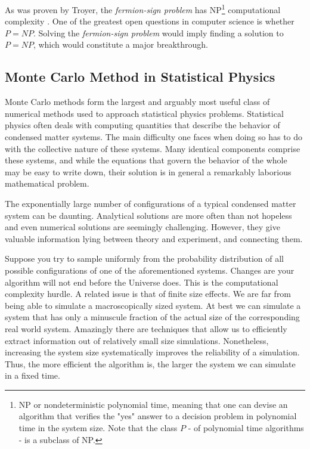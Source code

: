 As was proven by Troyer, the \emph{fermion-sign problem} has NP\footnote{NP or nondeterministic polynomial time, meaning that one can devise an algorithm that verifies the "yes" answer to a decision problem in polynomial time in the system size.
Note that the class $P$ - of polynomial time algorithms - is a subclass of NP.} computational complexity \cite{troyer_computational_2005}.
One of the greatest open questions in computer science is whether $P = NP$.
Solving the \emph{fermion-sign problem} would imply finding a solution to $P = NP$, which would constitute a major breakthrough.

\subsection{Monte Carlo Method in Statistical Physics}

Monte Carlo methods form the largest and arguably most useful class of numerical methods used to approach statistical physics problems.
Statistical physics often deals with computing quantities that describe the behavior of condensed matter systems.
The main difficulty one faces when doing so has to do with the collective nature of these systems.
Many identical components comprise these systems, and while the equations that govern the behavior of the whole may be easy to write down, their solution is in general a remarkably laborious mathematical problem.

The exponentially large number of configurations of a typical condensed matter system can be daunting.
Analytical solutions are more often than not hopeless and even numerical solutions are seemingly challenging.
However, they give valuable information lying between theory and experiment, and connecting them.

Suppose you try to sample uniformly from the probability distribution of all possible configurations of one of the aforementioned systems.
Changes are your algorithm will not end before the Universe does.
This is the computational complexity hurdle.
A related issue is that of finite size effects.
We are far from being able to simulate a macroscopically sized system. 
At best we can simulate a system that has only a minuscule fraction of the actual size of the corresponding real world system.
Amazingly there are techniques that allow us to efficiently extract information out of relatively small size simulations.
Nonetheless, increasing the system size systematically improves the reliability of a simulation.
Thus, the more efficient the algorithm is, the larger the system we can simulate in a fixed time.

